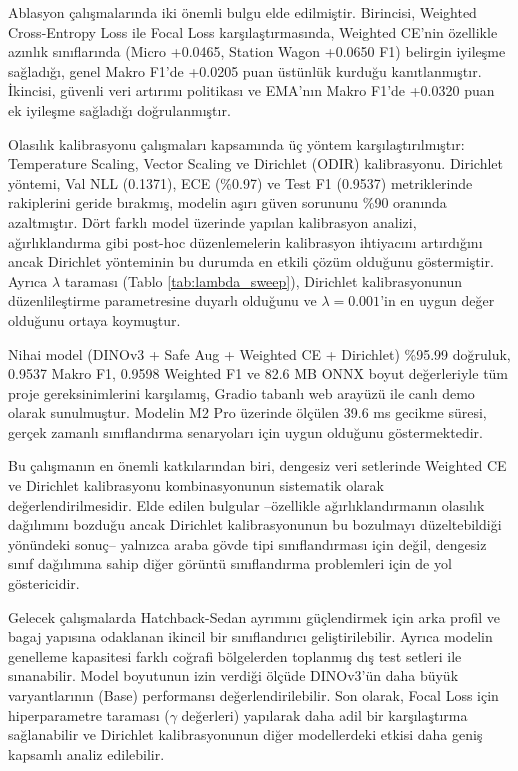 \documentclass[conference]{IEEEtran}
\begin{document}
Ablasyon çalışmalarında iki önemli bulgu elde edilmiştir. Birincisi, Weighted Cross-Entropy Loss ile Focal Loss karşılaştırmasında, Weighted CE'nin özellikle azınlık sınıflarında (Micro +0.0465, Station Wagon +0.0650 F1) belirgin iyileşme sağladığı, genel Makro F1'de +0.0205 puan üstünlük kurduğu kanıtlanmıştır. İkincisi, güvenli veri artırımı politikası ve EMA'nın Makro F1'de +0.0320 puan ek iyileşme sağladığı doğrulanmıştır.

Olasılık kalibrasyonu çalışmaları kapsamında üç yöntem karşılaştırılmıştır: Temperature Scaling, Vector Scaling ve Dirichlet (ODIR) kalibrasyonu. Dirichlet yöntemi, Val NLL (0.1371), ECE (\%0.97) ve Test F1 (0.9537) metriklerinde rakiplerini geride bırakmış, modelin aşırı güven sorununu \%90 oranında azaltmıştır. Dört farklı model üzerinde yapılan kalibrasyon analizi, ağırlıklandırma gibi post-hoc düzenlemelerin kalibrasyon ihtiyacını artırdığını ancak Dirichlet yönteminin bu durumda en etkili çözüm olduğunu göstermiştir. Ayrıca $\lambda$ taraması (Tablo \ref{tab:lambda_sweep}), Dirichlet kalibrasyonunun düzenlileştirme parametresine duyarlı olduğunu ve $\lambda=0.001$'in en uygun değer olduğunu ortaya koymuştur.

Nihai model (DINOv3 + Safe Aug + Weighted CE + Dirichlet) \%95.99 doğruluk, 0.9537 Makro F1, 0.9598 Weighted F1 ve 82.6 MB ONNX boyut değerleriyle tüm proje gereksinimlerini karşılamış, Gradio tabanlı web arayüzü ile canlı demo olarak sunulmuştur. Modelin M2 Pro üzerinde ölçülen 39.6 ms gecikme süresi, gerçek zamanlı sınıflandırma senaryoları için uygun olduğunu göstermektedir.

Bu çalışmanın en önemli katkılarından biri, dengesiz veri setlerinde Weighted CE ve Dirichlet kalibrasyonu kombinasyonunun sistematik olarak değerlendirilmesidir. Elde edilen bulgular --özellikle ağırlıklandırmanın olasılık dağılımını bozduğu ancak Dirichlet kalibrasyonunun bu bozulmayı düzeltebildiği yönündeki sonuç-- yalnızca araba gövde tipi sınıflandırması için değil, dengesiz sınıf dağılımına sahip diğer görüntü sınıflandırma problemleri için de yol göstericidir.

Gelecek çalışmalarda Hatchback-Sedan ayrımını güçlendirmek için arka profil ve bagaj yapısına odaklanan ikincil bir sınıflandırıcı geliştirilebilir. Ayrıca modelin genelleme kapasitesi farklı coğrafi bölgelerden toplanmış dış test setleri ile sınanabilir. Model boyutunun izin verdiği ölçüde DINOv3'ün daha büyük varyantlarının (Base) performansı değerlendirilebilir. Son olarak, Focal Loss için hiperparametre taraması ($\gamma$ değerleri) yapılarak daha adil bir karşılaştırma sağlanabilir ve Dirichlet kalibrasyonunun diğer modellerdeki etkisi daha geniş kapsamlı analiz edilebilir.



\end{document}
